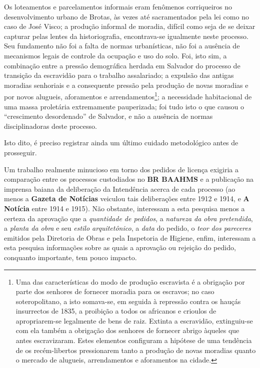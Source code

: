 Os loteamentos e parcelamentos informais eram fenômenos corriqueiros no desenvolvimento urbano de Brotas, às vezes até sacramentados pela lei como no caso de José Visco; a produção informal de moradia, difícil como seja de se deixar capturar pelas lentes da historiografia, encontrava-se igualmente neste processo. Seu fundamento não foi a falta de normas urbanísticas, não foi a ausência de mecanismos legais de controle da ocupação e uso do solo. Foi, isto sim, a combinação entre a pressão demográfica herdada em Salvador do processo de transição da escravidão para o trabalho assalariado; a expulsão das antigas moradias senhoriais e a consequente pressão pela produção de novas moradias e por novos alugueis, aforamentos e arrendamentos\footnote{Uma das características do modo de produção escravista é a obrigação por parte dos senhores de fornecer moradia para os escravos; no caso soteropolitano, a isto somava-se, em seguida à repressão contra os hauçás insurrectos de 1835, a proibição a todos os africanos e crioulos de apropriarem-se legalmente de bens de raiz. Extinta a escravidão, extinguiu-se com ela também a obrigação dos senhores de fornecer abrigo àqueles que antes escravizaram. Estes elementos configuram a hipótese de uma tendência de os recém-libertos pressionarem tanto a produção de novas moradias quanto o mercado de alugueis, arrendamentos e aforamentos na cidade.}; a necessidade habitacional de uma massa proletária extremamente pauperizada; foi tudo isto o que causou o ``crescimento desordenado'' de Salvador, e não a ausência de normas disciplinadoras deste processo.

Isto dito, é preciso registrar ainda um último cuidado metodológico antes de prosseguir. 

Um trabalho realmente minucioso em torno dos pedidos de licença exigiria a comparação entre os processos custodiados no \textbf{BR BAAHMS} e a publicação na imprensa baiana da deliberação da Intendência acerca de cada processo (ao menos a \textbf{Gazeta de Notícias} veiculou tais deliberações entre 1912 e 1914, e \textbf{A Notícia} entre 1914 e 1915). Não obstante, interessam a esta pesquisa menos a certeza da aprovação que a \textit{quantidade de pedidos}, a \textit{natureza da obra pretendida}, a \textit{planta da obra} e seu \textit{estilo arquitetônico}, a \textit{data} do pedido, o \textit{teor dos pareceres} emitidos pela Diretoria de Obras e pela Inspetoria de Higiene, enfim, interessam a esta pesquisa informações sobre as quais a aprovação ou rejeição do pedido, conquanto importante, tem pouco impacto.

